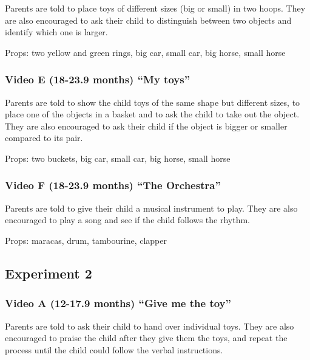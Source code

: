 \documentclass[]{article}
\begin{document}
Parents are told to place toys of different sizes (big or small) in two
hoops. They are also encouraged to ask their child to distinguish
between two objects and identify which one is larger.

Props: two yellow and green rings, big car, small car, big horse, small
horse

\hypertarget{video-e-18-23.9-months-my-toys}{%
\subsubsection{Video E (18-23.9 months) ``My
toys''}\label{video-e-18-23.9-months-my-toys}}

Parents are told to show the child toys of the same shape but different
sizes, to place one of the objects in a basket and to ask the child to
take out the object. They are also encouraged to ask their child if the
object is bigger or smaller compared to its pair.

Props: two buckets, big car, small car, big horse, small horse

\hypertarget{video-f-18-23.9-months-the-orchestra}{%
\subsubsection{Video F (18-23.9 months) ``The
Orchestra''}\label{video-f-18-23.9-months-the-orchestra}}

Parents are told to give their child a musical instrument to play. They
are also encouraged to play a song and see if the child follows the
rhythm.

Props: maracas, drum, tambourine, clapper

\hypertarget{experiment-2-1}{%
\subsection{Experiment 2}\label{experiment-2-1}}

\hypertarget{video-a-12-17.9-months-give-me-the-toy}{%
\subsubsection{Video A (12-17.9 months) ``Give me the
toy''}\label{video-a-12-17.9-months-give-me-the-toy}}

Parents are told to ask their child to hand over individual toys. They
are also encouraged to praise the child after they give them the toys,
and repeat the process until the child could follow the verbal
instructions.
\end{document}
